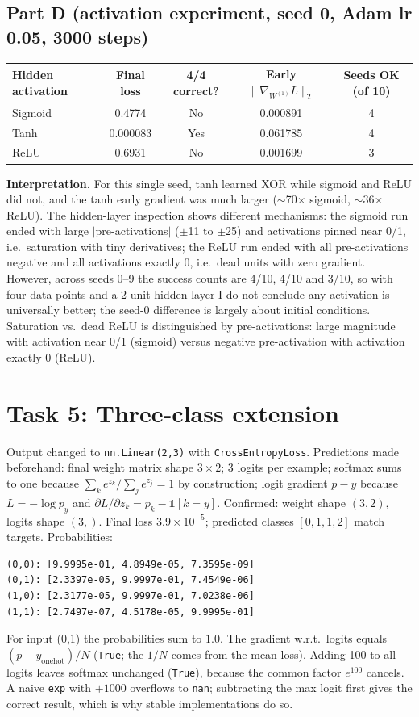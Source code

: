 \documentclass[10pt,a4paper]{article}
\begin{document}
\subsection*{Part D (activation experiment, seed 0, Adam lr 0.05, 3000 steps)}
\begin{center}\begin{tabular}{lcccc}\toprule
Hidden activation & Final loss & 4/4 correct? & Early $\|\nabla_{W^{(1)}}L\|_2$ & Seeds OK (of 10)\\\midrule
Sigmoid & 0.4774 & No & 0.000891 & 4\\
Tanh & 0.000083 & Yes & 0.061785 & 4\\
ReLU & 0.6931 & No & 0.001699 & 3\\\bottomrule\end{tabular}\end{center}
\textbf{Interpretation.} For this single seed, tanh learned XOR while sigmoid and ReLU did not, and the tanh early gradient was much larger ($\sim$70$\times$ sigmoid, $\sim$36$\times$ ReLU). The hidden-layer inspection shows different mechanisms: the sigmoid run ended with large $|$pre-activations$|$ ($\pm$11 to $\pm$25) and activations pinned near 0/1, i.e.\ saturation with tiny derivatives; the ReLU run ended with all pre-activations negative and all activations exactly 0, i.e.\ dead units with zero gradient. However, across seeds 0--9 the success counts are 4/10, 4/10 and 3/10, so with four data points and a 2-unit hidden layer I do not conclude any activation is universally better; the seed-0 difference is largely about initial conditions. Saturation vs.\ dead ReLU is distinguished by pre-activations: large magnitude with activation near 0/1 (sigmoid) versus negative pre-activation with activation exactly 0 (ReLU).

\section*{Task 5: Three-class extension}
Output changed to \texttt{nn.Linear(2,3)} with \texttt{CrossEntropyLoss}. Predictions made beforehand: final weight matrix shape $3\times2$; 3 logits per example; softmax sums to one because $\sum_k e^{z_k}/\sum_j e^{z_j}=1$ by construction; logit gradient $p-y$ because $L=-\log p_y$ and $\partial L/\partial z_k=p_k-\mathbb 1[k=y]$. Confirmed: weight shape $(3,2)$, logits shape $(3,)$. Final loss $3.9\times10^{-5}$; predicted classes $[0,1,1,2]$ match targets. Probabilities:
\begin{Verbatim}
(0,0): [9.9995e-01, 4.8949e-05, 7.3595e-09]
(0,1): [2.3397e-05, 9.9997e-01, 7.4549e-06]
(1,0): [2.3177e-05, 9.9997e-01, 7.0238e-06]
(1,1): [2.7497e-07, 4.5178e-05, 9.9995e-01]
\end{Verbatim}
For input (0,1) the probabilities sum to $1.0$. The gradient w.r.t.\ logits equals $(p-y_{\text{onehot}})/N$ (\texttt{True}; the $1/N$ comes from the mean loss). Adding 100 to all logits leaves softmax unchanged (\texttt{True}), because the common factor $e^{100}$ cancels. A naive \texttt{exp} with $+1000$ overflows to \texttt{nan}; subtracting the max logit first gives the correct result, which is why stable implementations do so.
\end{document}
